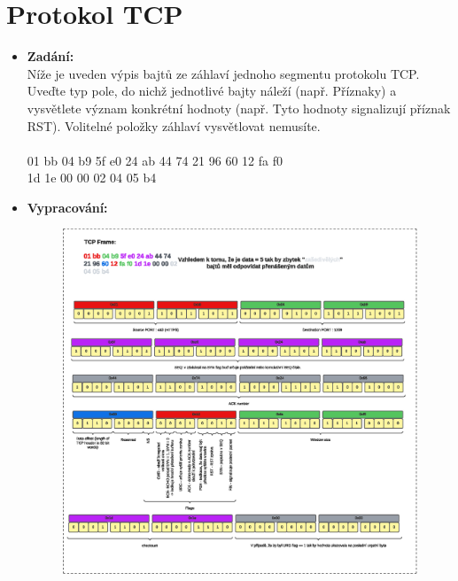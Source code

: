 \documentclass[10pt, a4paper]{article}%
\begin{document}
		\clearpage
	\section*{\large{\textbf{ Protokol TCP}}}
		\begin{itemize}[label={}]
			\item \textbf{Zadání:}\\
			Níže je uveden výpis bajtů ze záhlaví jednoho segmentu protokolu TCP. Uveďte typ pole, do nichž
			jednotlivé bajty náleží (např. Příznaky) a vysvětlete význam konkrétní hodnoty (např. Tyto
			hodnoty signalizují příznak RST). Volitelné položky záhlaví vysvětlovat nemusíte.\\\\

			 01 bb 04 b9 5f e0 24 ab 44 74 21 96 60 12 fa f0 \\
			 1d 1e 00 00 02 04 05 b4 


			\item \textbf{Vypracování:}\\
			\begin{figure}[ht!]
				\centering
				\includegraphics[width = 1\textwidth]{pictures/TCP.eps}
			\end{figure}
		\end{itemize}
		\clearpage
\end{document}
